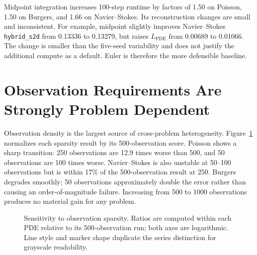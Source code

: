 \documentclass[twoside,11pt]{article}
\newcommand{\Lpde}{L_{\mathrm{PDE}}}
\newcommand{\hsd}{\texttt{hybrid\_s2d}}
\begin{document}
Midpoint integration increases 100-step runtime by factors of 1.50 on
Poisson, 1.50 on Burgers, and 1.66 on Navier--Stokes.  Its reconstruction
changes are small and inconsistent.  For example, midpoint slightly improves
Navier--Stokes \hsd{} from 0.13336 to 0.13279, but raises \(\Lpde\) from
0.00689 to 0.01066.  The change is smaller than the five-seed variability and
does not justify the additional compute as a default.  Euler is therefore the
more defensible baseline.

\section{Observation Requirements Are Strongly Problem Dependent}
\label{sec:observations}

Observation density is the largest source of cross-problem heterogeneity.
Figure~\ref{fig:sensor-sparsity} normalizes each sparsity result by its
500-observation score.  Poisson shows a sharp transition: 250 observations
are 12.9 times worse than 500, and 50 observations are 100 times worse.
Navier--Stokes is also unstable at 50--100 observations but is within 17\% of
the 500-observation result at 250.  Burgers degrades smoothly; 50 observations
approximately double the error rather than causing an order-of-magnitude
failure.  Increasing from 500 to 1000 observations produces no material gain
for any problem.

\begin{figure}[t]
\centering
{}
\caption{Sensitivity to observation sparsity.  Ratios are computed within
each PDE relative to its 500-observation run; both axes are logarithmic.
Line style and marker shape duplicate the series distinction for grayscale
readability.}
\label{fig:sensor-sparsity}
\end{figure}
\end{document}
